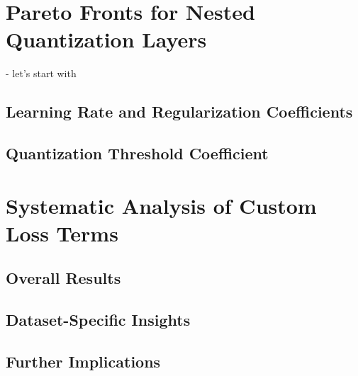 
\section{Pareto Fronts for Nested Quantization Layers}
\label{sec:paretofronts}

- let's start with 


\subsection{Learning Rate and Regularization Coefficients}
\label{subsec:learning rate}

\subsection{Quantization Threshold Coefficient}
\label{subsec:penalty rate}


\section{Systematic Analysis of Custom Loss Terms}
\label{sec:dataset}

\subsection{Overall Results}
\label{subsec:overallresults}

\subsection{Dataset-Specific Insights}
\label{subsec:cifat10}

\subsection{Further Implications}
\label{subsec:imagenette}

